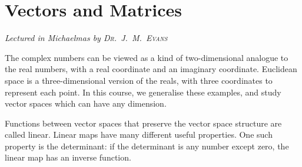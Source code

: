 \chapter[Vectors and Matrices \\ \textnormal{\emph{Lectured in Michaelmas \oldstylenums{2020} by \textsc{Dr.\ J.\ M.\ Evans}}}]{Vectors and Matrices}
\emph{\Large Lectured in Michaelmas  by \textsc{Dr.\ J.\ M.\ Evans}}

The complex numbers can be viewed as a kind of two-dimensional analogue to the real numbers, with a real coordinate and an imaginary coordinate.
Euclidean space is a three-dimensional version of the reals, with three coordinates to represent each point.
In this course, we generalise these examples, and study vector spaces which can have any dimension.

Functions between vector spaces that preserve the vector space structure are called linear.
Linear maps have many different useful properties.
One such property is the determinant: if the determinant is any number except zero, the linear map has an inverse function.


